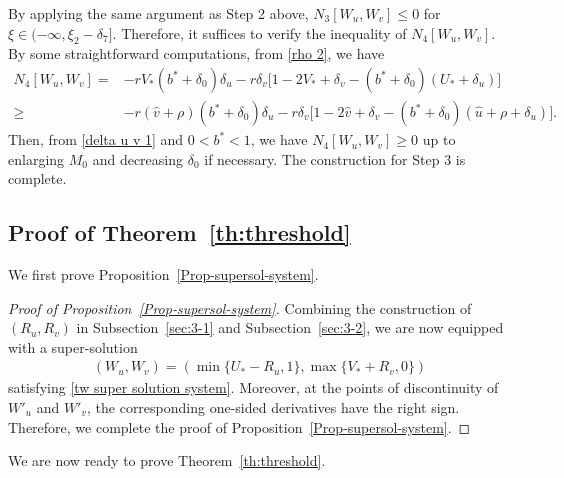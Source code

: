 \documentclass[11pt,a4paper]{article}
\numberwithin{equation}{section}
\numberwithin{figure}{section}
\newcommand\beaa{\begin{eqnarray*}}
\newcommand\eeaa{\end{eqnarray*}}
\begin{document}
By applying the same argument as Step 2 above, $N_3[W_u,W_v]\le 0$ for $\xi\in(-\infty,\xi_2-\delta_7]$. Therefore, it suffices to verify the inequality of $N_4[W_u,W_v]$.  By some straightforward computations, from \eqref{rho 2}, we have
\begin{equation*}
\begin{aligned}
N_4[W_u,W_v]= & -rV_*(b^*+\delta_0)\delta_u-r\delta_v\Big[1-2V_*+\delta_v-(b^*+\delta_0)(U_*+\delta_u)\Big]\\
\ge & -r(\hat v+\rho)(b^*+\delta_0)\delta_u-r\delta_v\Big[1-2\hat v+\delta_v-(b^*+\delta_0)(\hat u+\rho+\delta_u)\Big].
\end{aligned}
\end{equation*}
Then, from \eqref{delta u v 1} and $0<b^*<1$, we have $N_4[W_u,W_v]\ge 0$ up to enlarging $M_0$ and decreasing $\delta_0$ if necessary. The construction for Step 3 is complete.




\bigskip
\subsection{Proof of Theorem~\ref{th:threshold}}

\noindent

We first prove Proposition~\ref{Prop-supersol-system}.

\begin{proof}[Proof of Proposition~\ref{Prop-supersol-system}]
Combining the construction of $(R_u,R_v)$ in Subsection~\ref{sec:3-1} and Subsection~\ref{sec:3-2},
we are now equipped with a super-solution
\beaa
(W_u,W_v)=(\min\{U_*-R_u,1\},\max\{V_*+R_v,0\})
\eeaa
satisfying \eqref{tw super solution system}.
Moreover, at the points of discontinuity of $W'_u$ and $W'_v$,
the corresponding one-sided derivatives have the right sign.
Therefore, we complete the proof of Proposition~\ref{Prop-supersol-system}.
\end{proof}






We are now ready to prove Theorem~\ref{th:threshold}.
\end{document}
